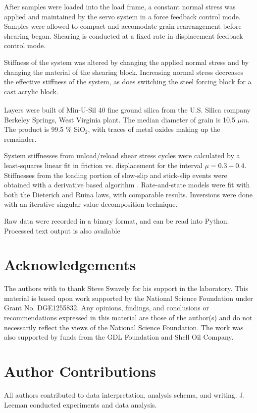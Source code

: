 \documentclass[11pt]{article}
\begin{document}
After samples were loaded into the load frame, a constant normal stress was
applied and maintained by the servo system in a force feedback control mode.
Samples were allowed to compact and accomodate grain rearrangement before
shearing began. Shearing is conducted at a fixed rate in displacement feedback
control mode.

Stiffness of the system was altered by changing the applied normal stress and by
changing the material of the shearing block. Increasing normal stress decreases
the effective stiffness of the system, as does switching the steel forcing block
for a cast acrylic block.

Layers were built of Min-U-Sil\textsuperscript{\textregistered} 40 fine ground
silica from the U.S. Silica\textsuperscript{\textregistered} company Berkeley
Springs, West Virginia plant. The median diameter of grain is 10.5 $\mu m$. The
product is 99.5 \% SiO$_2$, with traces of metal oxides making up the remainder.

System stiffnesses from unload/reload shear stress cycles were calculated by a
least-squares linear fit in friction vs. displacement for the interval $\mu =
0.3-0.4$. Stiffnesses from the loading portion of slow-slip and stick-slip
events were obtained with a derivative based algorithm \cite{Leeman:2015}.
Rate-and-state models were fit with both the Dieterich and
Ruina laws, with comparable results. Inversions were done with an iterative
singular value decomposition technique.

Raw data were recorded in a binary format, and can be read into Python\cite{Leeman:BiaxRead}.
Processed text output is also available



\section{Acknowledgements}
The authors with to thank Steve Swavely for his support in the laboratory. This
material is based upon work supported by the National Science Foundation under
Grant No. DGE1255832.  Any opinions, findings, and conclusions or
recommendations expressed in this material are those of the author(s) and do not
necessarily reflect the views of the National Science Foundation. The work was
also supported by funds from the GDL Foundation and Shell Oil Company.

\section{Author Contributions}
All authors contributed to data interpretation, analysis schema, and writing.
J. Leeman conducted experiments and data analysis.
\end{document}
